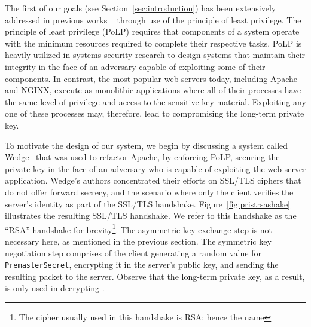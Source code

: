 \documentclass[../main.tex]{subfiles}
\begin{document}
The first of our goals (see Section~\ref{sec:introduction}) has been
extensively addressed in previous works ~\cite{Bittau08, Krohn2004}
through use of the principle of least privilege. The principle of
least privilege (PoLP) requires that components of a system operate
with the minimum resources required to complete their respective
tasks. PoLP is heavily utilized in systems security research to design
systems that maintain their integrity in the face of an adversary
capable of exploiting some of their components. In contrast, the most
popular web servers today, including Apache and NGINX, execute as
monolithic applications where all of their processes have the same
level of privilege and access to the sensitive key material.
Exploiting any one of these processes may, therefore, lead to
compromising the long-term private key.

To motivate the design of our system, we begin by discussing a system
called Wedge~\cite{Bittau08} that was used to refactor Apache, by
enforcing PoLP, securing the private key in the face of an adversary
who is capable of exploiting the web server application. Wedge's
authors concentrated their efforts on SSL/TLS ciphers that do not
offer forward secrecy, and the scenario where only the client verifies
the server's identity as part of the SSL/TLS handshake.
Figure~\ref{fig:pristrsashake} illustrates the resulting SSL/TLS
handshake. We refer to this handshake as the ``RSA'' handshake for
brevity\footnote{The cipher usually used in this handshake is RSA;
  hence the name}. The asymmetric key exchange step is not necessary
here, as mentioned in the previous section. The symmetric key
negotiation step comprises of the client generating a random value for
\texttt{PremasterSecret}, encrypting it in the server's public key,
and sending the resulting packet to the server. Observe that the
long-term private key, as a result, is only used in decrypting
\premaster.
\end{document}
